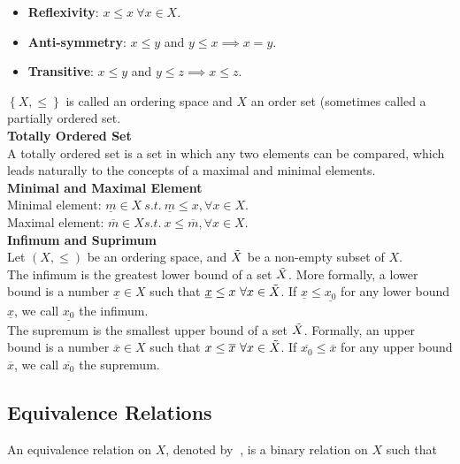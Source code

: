 \documentclass{article}
\numberwithin{theorem}{subsection}
\numberwithin{theorem}{subsubsection}
\theoremstyle{definition}
\numberwithin{definition}{subsection}
\numberwithin{definition}{subsubsection}
\begin{document}
\begin{itemize}
    \item \textbf{Reflexivity}: $x \leq x \ \forall x \in X$.
    \item \textbf{Anti-symmetry}: $x \leq y$ and $y \leq x \implies x = y$.
    \item \textbf{Transitive}: $x \leq y$ and $y \leq z \implies x \leq z$.
\end{itemize}

\noindent $\left \{ X, \leq \right \}$ is called an ordering space and $X$ an order set (sometimes called a partially ordered set. \\

\noindent \textbf{Totally Ordered Set}\\
\indent A totally ordered set is a set in which any two elements can be compared, which leads naturally to the concepts of a maximal and minimal elements. \\


\noindent \textbf{Minimal and Maximal Element}\\
\indent Minimal element: $\underline{m} \in X\ s.t.\ \underline{m} \leq x, \forall x \in X$.\\
\indent Maximal element: $\overline{m} \in X s.t.\ x \leq \overline{m}, \forall x \in X$.
\\

\noindent \textbf{Infimum and Suprimum}\\
\indent Let $(X, \leq)$ be an ordering space, and $\Tilde{X}$ be a non-empty subset of $X$. \\
\indent The infimum is the greatest lower bound of a set $\Tilde{X}$. More formally, a lower bound is a number $\underline{x} \in X$ such that $\underline{x} \leq x\  \forall x \in \Tilde{X}$. If $\underline{x} \leq \underline{x_{0}}$ for any lower bound $\underline{x}$, we call $\underline{x_{0}}$ the infimum. \\
\indent The supremum is the smallest upper bound of a set $\Tilde{X}$. Formally, an upper bound is a number $\overline{x} \in X$ such that $x \leq \overline{x}\ \forall x \in \Tilde{X}$. If $\overline{x_{0}} \leq \overline{x}$ for any upper bound $\overline{x}$, we call $\overline{x_0}$ the supremum.


\subsection{Equivalence Relations}
An equivalence relation on $X$, denoted by $~$, is a binary relation on $X$ such that
\end{document}

